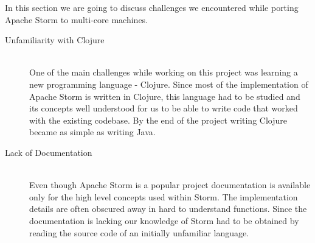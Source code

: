 In this section we are going to discuss challenges we encountered while porting Apache Storm to multi-core machines.

\begin{description}
	\item[Unfamiliarity with Clojure] \hfill \\
	One of the main challenges while working on this project was learning a new programming language - Clojure. Since most of the implementation of Apache Storm is written in Clojure, this language had to be studied and its concepts well understood for us to be able to write code that worked with the existing codebase. By the end of the project writing Clojure became as simple as writing Java.
	\item[Lack of Documentation] \hfill \\
	Even though Apache Storm is a popular project documentation is available only for the high level concepts used within Storm. The implementation details are often obscured away in hard to understand functions. Since the documentation is lacking our knowledge of Storm had to be obtained by reading the source code of an initially unfamiliar language.
\end{description}


